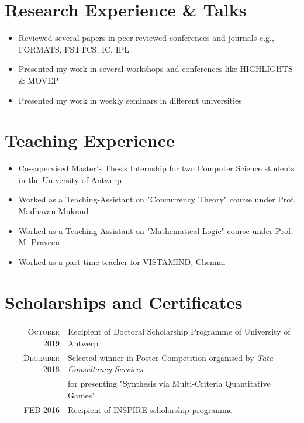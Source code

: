 \documentclass[a4paper,10pt]{article}
\begin{document}
\section{Research Experience \& Talks}
\begin{itemize}
    \item Reviewed several papers in peer-reviewed conferences and journals e.g., FORMATS, FSTTCS, IC, IPL
    
    \item Presented my work in several workshops and conferences like HIGHLIGHTS \& MOVEP 
    
    \item Presented my work in weekly seminars in different universities
    
    
\end{itemize}
\section{Teaching Experience}
\begin{itemize}
\item Co-supervised Master's Thesis Internship for two Computer Science students in the University of Antwerp
\item Worked as a Teaching-Assistant on "Concurrency Theory" course under Prof. Madhavan Mukund
\item Worked as a Teaching-Assistant on "Mathematical Logic" course under Prof. M. Praveen
\item Worked as a part-time teacher for VISTAMIND, Chennai
\end{itemize}

\section{Scholarships and Certificates}
\begin{tabular}{rl}
 \textsc {October} 2019 & Recipient of Doctoral Scholarship Programme of University of Antwerp\\
 
 \textsc {December} 2018 & Selected winner in Poster Competition organised by \textit{Tata Consultancy Services}\\ &for presenting "Synthesis via Multi-Criteria Quantitative Games".\\
 
 
 \textsc{FEB} 2016 & Recipient of \href{http://www.online-inspire.gov.in/}{INSPIRE} scholarship programme\\
\end{tabular}
\end{document}
